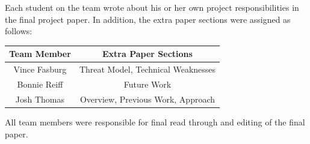 \documentclass[pagenumbers]{ieee}
\begin{document}
Each student on the team wrote about his or her own project responsibilities in the final project paper. In addition, the extra paper sections were assigned as follows:

\begin{center}
	\begin{tabular}{ | c | c | }
		\hline \textbf{Team Member} & \textbf{Extra Paper Sections} \\ \hline
		Vince Fasburg & Threat Model, Technical Weaknesses \\ \hline
		Bonnie Reiff &  Future Work \\ \hline
		Josh Thomas & Overview, Previous Work, Approach  \\ \hline
	\end{tabular}
\end{center}

 All team members were responsible for final read through and editing of the final paper.




\end{document}
